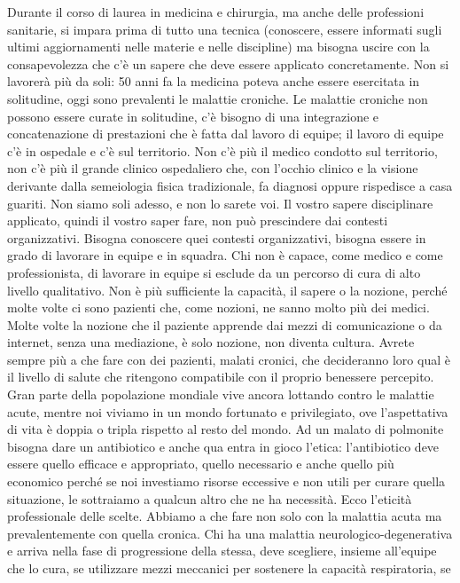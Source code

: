Durante il corso di laurea in medicina e chirurgia, ma anche delle
professioni sanitarie, si impara prima di tutto una tecnica (conoscere,
essere informati sugli ultimi aggiornamenti nelle materie e nelle
discipline) ma bisogna uscire con la consapevolezza che c'è un sapere
che deve essere applicato concretamente. Non si lavorerà più da soli: 50
anni fa la medicina poteva anche essere esercitata in solitudine, oggi
sono prevalenti le malattie croniche. Le malattie croniche non possono
essere curate in solitudine, c'è bisogno di una integrazione e
concatenazione di prestazioni che è fatta dal lavoro di equipe; il
lavoro di equipe c'è in ospedale e c'è sul territorio. Non c'è più il
medico condotto sul territorio, non c'è più il grande clinico
ospedaliero che, con l'occhio clinico e la visione derivante dalla
semeiologia fisica tradizionale, fa diagnosi oppure rispedisce a casa
guariti. Non siamo soli adesso, e non lo sarete voi. Il vostro sapere
disciplinare applicato, quindi il vostro saper fare, non può prescindere
dai contesti organizzativi. Bisogna conoscere quei contesti
organizzativi, bisogna essere in grado di lavorare in equipe e in
squadra. Chi non è capace, come medico e come professionista, di
lavorare in equipe si esclude da un percorso di cura di alto livello
qualitativo. Non è più sufficiente la capacità, il sapere o la nozione,
perché molte volte ci sono pazienti che, come nozioni, ne sanno molto
più dei medici. Molte volte la nozione che il paziente apprende dai
mezzi di comunicazione o da internet, senza una mediazione, è solo
nozione, non diventa cultura. Avrete sempre più a che fare con dei
pazienti, malati cronici, che decideranno loro qual è il livello di
salute che ritengono compatibile con il proprio benessere percepito.
Gran parte della popolazione mondiale vive ancora lottando contro le
malattie acute, mentre noi viviamo in un mondo fortunato e privilegiato,
ove l'aspettativa di vita è doppia o tripla rispetto al resto del mondo.
Ad un malato di polmonite bisogna dare un antibiotico e anche qua entra
in gioco l'etica: l'antibiotico deve essere quello efficace e
appropriato, quello necessario e anche quello più economico perché se
noi investiamo risorse eccessive e non utili per curare quella
situazione, le sottraiamo a qualcun altro che ne ha necessità. Ecco
l'eticità professionale delle scelte. Abbiamo a che fare non solo con la
malattia acuta ma prevalentemente con quella cronica. Chi ha una
malattia neurologico-degenerativa e arriva nella fase di progressione
della stessa, deve scegliere, insieme all'equipe che lo cura, se
utilizzare mezzi meccanici per sostenere la capacità respiratoria, se
